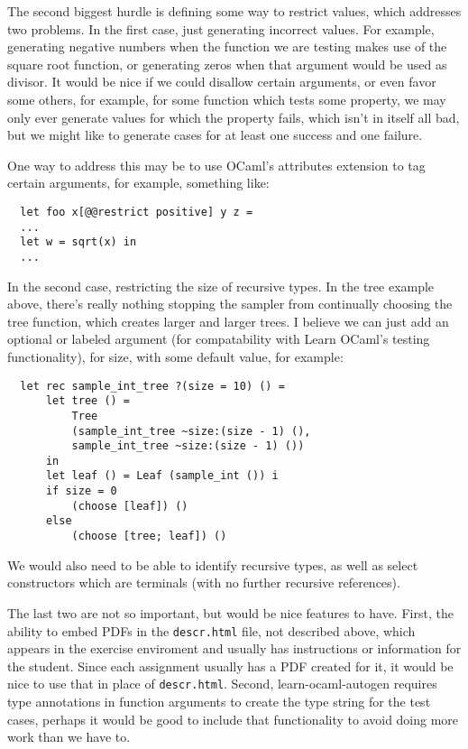 \documentclass[11pt]{article} %
\begin{document}
The second biggest hurdle is defining some way to restrict values, which addresses two problems. In the first case, just generating incorrect values. For example, generating negative numbers when the function we are testing makes use of the square root function, or generating zeros when that argument would be used as divisor. It would be nice if we could disallow certain arguments, or even favor some others, for example, for some function which tests some property, we may only ever generate values for which the property fails, which isn't in itself all bad, but we might like to generate cases for at least one success and one failure.

One way to address this may be to use OCaml's attributes extension to tag certain arguments, for example, something like:

\begin{lstlisting}
  let foo x[@@restrict positive] y z =
  ...
  let w = sqrt(x) in
  ...
\end{lstlisting}

In the second case, restricting the size of recursive types. In the tree example above, there's really nothing stopping the sampler from continually choosing the tree function, which creates larger and larger trees. I believe we can just add an optional or labeled argument (for compatability with Learn OCaml's testing functionality), for size, with some default value, for example:

\begin{lstlisting}
  let rec sample_int_tree ?(size = 10) () =
      let tree () =
          Tree
          (sample_int_tree ~size:(size - 1) (),
          sample_int_tree ~size:(size - 1) ())
      in
      let leaf () = Leaf (sample_int ()) i
      if size = 0
          (choose [leaf]) ()
      else
          (choose [tree; leaf]) ()
\end{lstlisting}

We would also need to be able to identify recursive types, as well as select constructors which are terminals (with no further recursive references).

The last two are not so important, but would be nice features to have. First, the ability to embed PDFs in the \verb+descr.html+ file, not described above, which appears in the exercise enviroment and usually has instructions or information for the student. Since each assignment usually has a PDF created for it, it would be nice to use that in place of \verb+descr.html+. Second, learn-ocaml-autogen requires type annotations in function arguments to create the type string for the test cases, perhaps it would be good to include that functionality to avoid doing more work than we have to.
\end{document}
